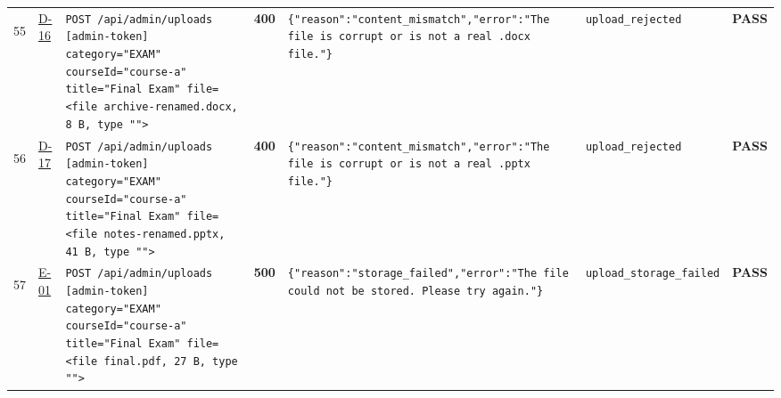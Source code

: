 \documentclass[10pt,a4paper]{article}
\begin{document}
\begin{landscape}
\begin{longtable}{@{}P{0.6cm}P{0.9cm}P{8.5cm}P{1.0cm}P{6.2cm}P{4.2cm}P{1.1cm}@{}}
\hypertarget{call55}{55} & \hyperlink{test-D-16}{D-16} & \texttt{POST /\allowbreak{}api/\allowbreak{}admin/\allowbreak{}uploads [admin-\allowbreak{}token] category=\allowbreak{}"\allowbreak{}EXAM"\allowbreak{} courseId=\allowbreak{}"\allowbreak{}course-\allowbreak{}a"\allowbreak{} title=\allowbreak{}"\allowbreak{}Final Exam"\allowbreak{} file=\allowbreak{}<file archive-\allowbreak{}renamed.\allowbreak{}docx,\allowbreak{} 8 B,\allowbreak{} type "\allowbreak{}"\allowbreak{}>} & \textcolor{warnamber}{\textbf{400}} & \texttt{\{"\allowbreak{}reason"\allowbreak{}:\allowbreak{}"\allowbreak{}content\_\allowbreak{}mismatch"\allowbreak{},\allowbreak{}"\allowbreak{}error"\allowbreak{}:\allowbreak{}"\allowbreak{}The file is corrupt or is not a real .\allowbreak{}docx file.\allowbreak{}"\allowbreak{}\}} & \texttt{upload\_\allowbreak{}rejected} & \textcolor{passgreen}{\textbf{PASS}} \\
\hypertarget{call56}{56} & \hyperlink{test-D-17}{D-17} & \texttt{POST /\allowbreak{}api/\allowbreak{}admin/\allowbreak{}uploads [admin-\allowbreak{}token] category=\allowbreak{}"\allowbreak{}EXAM"\allowbreak{} courseId=\allowbreak{}"\allowbreak{}course-\allowbreak{}a"\allowbreak{} title=\allowbreak{}"\allowbreak{}Final Exam"\allowbreak{} file=\allowbreak{}<file notes-\allowbreak{}renamed.\allowbreak{}pptx,\allowbreak{} 41 B,\allowbreak{} type "\allowbreak{}"\allowbreak{}>} & \textcolor{warnamber}{\textbf{400}} & \texttt{\{"\allowbreak{}reason"\allowbreak{}:\allowbreak{}"\allowbreak{}content\_\allowbreak{}mismatch"\allowbreak{},\allowbreak{}"\allowbreak{}error"\allowbreak{}:\allowbreak{}"\allowbreak{}The file is corrupt or is not a real .\allowbreak{}pptx file.\allowbreak{}"\allowbreak{}\}} & \texttt{upload\_\allowbreak{}rejected} & \textcolor{passgreen}{\textbf{PASS}} \\
\hypertarget{call57}{57} & \hyperlink{test-E-01}{E-01} & \texttt{POST /\allowbreak{}api/\allowbreak{}admin/\allowbreak{}uploads [admin-\allowbreak{}token] category=\allowbreak{}"\allowbreak{}EXAM"\allowbreak{} courseId=\allowbreak{}"\allowbreak{}course-\allowbreak{}a"\allowbreak{} title=\allowbreak{}"\allowbreak{}Final Exam"\allowbreak{} file=\allowbreak{}<file final.\allowbreak{}pdf,\allowbreak{} 27 B,\allowbreak{} type "\allowbreak{}"\allowbreak{}>} & \textcolor{failred}{\textbf{500}} & \texttt{\{"\allowbreak{}reason"\allowbreak{}:\allowbreak{}"\allowbreak{}storage\_\allowbreak{}failed"\allowbreak{},\allowbreak{}"\allowbreak{}error"\allowbreak{}:\allowbreak{}"\allowbreak{}The file could not be stored.\allowbreak{} Please try again.\allowbreak{}"\allowbreak{}\}} & \texttt{upload\_\allowbreak{}storage\_\allowbreak{}failed} & \textcolor{passgreen}{\textbf{PASS}} \\

\end{longtable}
\end{landscape}
\end{document}
